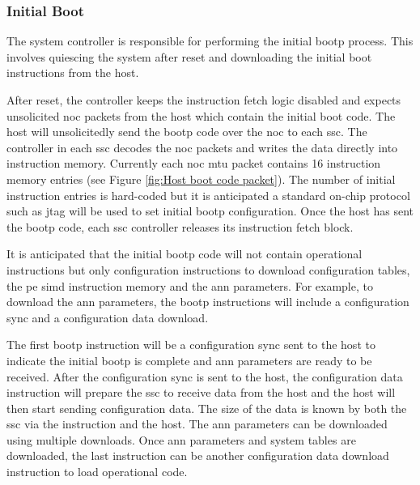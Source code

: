 \subsubsection{Initial Boot}
\label{sec:Initial Boot}

The system controller is responsible for performing the initial \ac{bootp} process.
This involves quiescing the system after reset and downloading the initial boot instructions from the host.

After reset, the controller keeps the instruction fetch logic disabled and expects unsolicited \ac{noc} packets from the host which contain the initial boot code.
The host will unsolicitedly send the \ac{bootp} code over the \ac{noc} to each \ac{ssc}.
The controller in each \ac{ssc} decodes the \ac{noc} packets and writes the data directly into instruction memory.
Currently each \ac{noc} \ac{mtu} packet contains 16 instruction memory entries (see Figure \ref{fig:Host boot code packet}).
The number of initial instruction entries is hard-coded but it is anticipated a standard on-chip protocol such as \ac{jtag} will be used to set initial \ac{bootp} configuration.
Once the host has sent the \ac{bootp} code, each \ac{ssc} controller releases its instruction fetch block.

It is anticipated that the initial \ac{bootp} code will not contain operational instructions but only configuration instructions to download configuration tables, the \ac{pe} \ac{simd} instruction memory and the \ac{ann} parameters.
For example, to download the \ac{ann} parameters, the \ac{bootp} instructions will include a configuration sync and a configuration data download.

The first \ac{bootp} instruction will be a configuration sync sent to the host to indicate the initial \ac{bootp} is complete and \ac{ann} parameters are ready to be received.
After the configuration sync is sent to the host, the configuration data instruction will prepare the \ac{ssc} to receive data from the host and the host will then start sending configuration data. 
The size of the data is known by both the \ac{ssc} via the instruction and the host.
The \ac{ann} parameters can be downloaded using multiple downloads.
Once \ac{ann} parameters and system tables are downloaded, the last instruction can be another configuration data download instruction to load operational code.

